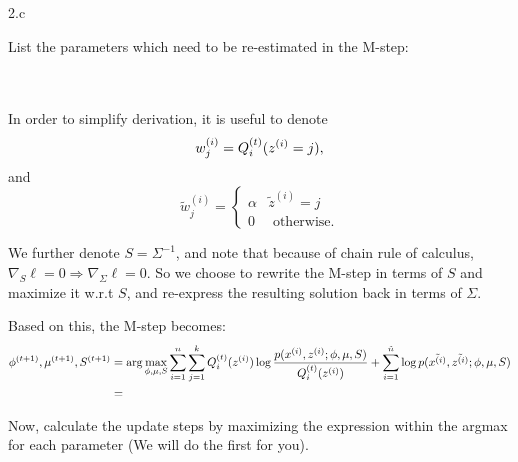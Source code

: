   \begin{answer}
  \end{answer}
\clearpage

\LARGE
2.c
\normalsize

  \begin{answer}
    List the parameters which need to be re-estimated in the M-step:\\\\\\

    \allowdisplaybreaks

    In order to simplify derivation, it is useful to denote $$w_j^{(i)} = Q^{(t)}_i(z^{(i)}=j),$$ and $$\tilde{w}_j^{(i)} = \begin{cases} \alpha & \tilde{z}^{(i)} = j \\ 0 & \text{ otherwise.} \end{cases}$$

    We further denote $S = \Sigma^{-1}$, and note that because of chain rule of calculus, $\nabla_S\ell = 0 \Rightarrow \nabla_\Sigma \ell = 0$. So we choose to rewrite the M-step in terms of $S$ and maximize it w.r.t $S$, and re-express the resulting solution back in terms of $\Sigma$.

    Based on this, the M-step becomes:
    \begin{align*}
    \phi^{(t+1)}, \mu^{(t+1)}, S^{(t+1)} &=  \arg\max_{\phi,\mu,S} \sum_{i=1}^{n} \sum_{j=1}^k Q_i^{(t)}(z^{(i)}) \log \frac{p(x^{(i)},z^{(i)};\phi,\mu,S)}{Q_i^{(t)}(z^{(i)})} + \sum_{i=1}^{\tilde{{n}}} \log p(\tilde{x^{(i)}}, \tilde{z^{(i)}}; \phi, \mu, S)\\
    &=\\
    \end{align*}

    Now, calculate the update steps by maximizing the expression within the argmax for each parameter (We will do the first for you).


\end{answer}
